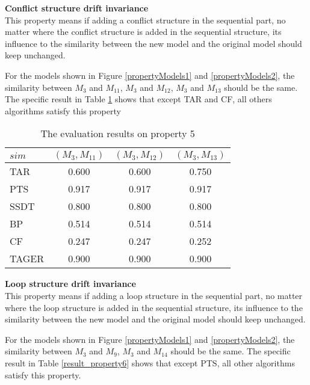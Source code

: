 \documentclass{llncs}
\begin{document}
\begin{property}
\textbf{Conflict structure drift invariance}\\ 
This property means if adding a conflict structure in the sequential part, no matter where the conflict structure is added in the sequential structure, its influence to the similarity between the new model and the original model should keep unchanged.
\end{property}
For the models shown in Figure \ref{propertyModels1} and \ref{propertyModels2}, the similarity between $M_{3}$ and $M_{11}$, $M_{3}$ and $M_{12}$, $M_{3}$ and $M_{13}$ should be the same. The specific result in Table \ref{result_property5} shows that except TAR and CF, all others algorithms satisfy this property
\begin{table}[!htb]
\centering
\caption{ The evaluation results on property 5 \label{result_property5}}
\begin{tabular}{l c c c} \hline
 $sim$ & $(M_{3},M_{11})$ & $(M_{3},M_{12})$ & $(M_{3},M_{13})$ \\ \hline
 TAR & 0.600 & 0.600 & 0.750 \\ 
 PTS & 0.917 & 0.917 & 0.917 \\ 
 SSDT& 0.800 & 0.800 & 0.800 \\ 
 BP& 0.514 & 0.514 & 0.514 \\ 
 CF& 0.247 & 0.247 & 0.252 \\ 
 TAGER& 0.900 & 0.900 & 0.900 \\ \hline
\end{tabular}
\end{table}
 
\begin{property}
\textbf{Loop structure drift invariance}\\
This property means if adding a loop structure in the sequential part, no matter where the loop structure is added in the sequential structure, its influence to the similarity between the new model and the original model should keep unchanged.
\end{property} 
For the models shown in Figure \ref{propertyModels1} and \ref{propertyModels2}, the similarity between $M_{3}$ and $M_{9}$, $M_{3}$ and $M_{14}$ should be the same. The specific result in Table \ref{result_property6} shows that except PTS, all other algorithms satisfy this property.
\end{document}
